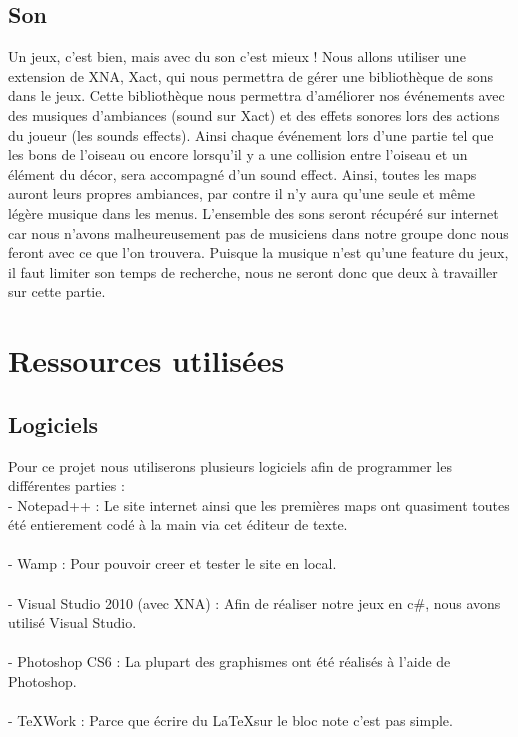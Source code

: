 \documentclass [11pt]{report}
\begin{document}
	\section {Son}
	Un jeux, c'est bien, mais avec du son c'est mieux ! Nous allons utiliser une extension de XNA, Xact, qui nous permettra de g\'erer une biblioth\`eque de sons dans le jeux. Cette biblioth\`eque nous permettra d'am\'eliorer nos \'ev\'enements avec des musiques d'ambiances (sound sur Xact) et des effets sonores lors des actions du joueur (les sounds effects). Ainsi chaque événement lors d'une partie tel que les bons de l'oiseau ou encore lorsqu'il y a une collision entre l'oiseau et un élément du décor, sera accompagné d'un sound effect. Ainsi, toutes les maps auront leurs propres ambiances, par contre il n'y aura qu'une seule et même légère musique dans les menus. L'ensemble des sons seront récupéré sur internet car nous n'avons malheureusement pas de musiciens dans notre groupe donc nous feront avec ce que l'on trouvera. Puisque la musique n'est qu'une feature du jeux, il faut limiter son temps de recherche, nous ne seront donc que deux à travailler sur cette partie.



\chapter {Ressources utilisées}
	\section {Logiciels}

	Pour ce projet nous utiliserons plusieurs logiciels afin de programmer les différentes parties :\\

	- Notepad++ : Le site internet ainsi que les premières maps ont quasiment toutes été entierement codé à la main via cet éditeur de texte.\\\\\indent
	- Wamp : Pour pouvoir creer et tester le site en local.\\\\\indent
	- Visual Studio 2010 (avec XNA) : Afin de réaliser notre jeux en c\#, nous avons utilisé Visual Studio.\\\\\indent
	- Photoshop CS6 : La plupart des graphismes ont été réalisés à l'aide de Photoshop.\\\\\indent
	- TeXWork : Parce que écrire du \LaTeX sur le bloc note c'est pas simple.\\\vspace{10mm}
\end{document}
